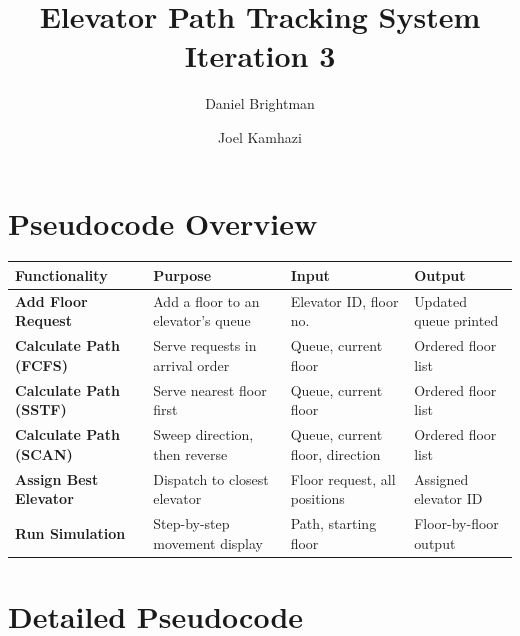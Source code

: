 \documentclass[a4paper,11pt]{article}
\title{\textbf{Elevator Path Tracking System} \\ Iteration 3}
\author{Daniel Brightman \and Joel Kamhazi}
\date{}
\begin{document}
\maketitle

\section{Pseudocode Overview}

\begin{tabular}{>{\bfseries}p{3.5cm} p{4cm} p{3cm} p{3cm}}
\toprule
Functionality & Purpose & Input & Output \\
\midrule
Add Floor Request   & Add a floor to an elevator's queue        & Elevator ID, floor no.           & Updated queue printed \\
Calculate Path (FCFS) & Serve requests in arrival order         & Queue, current floor             & Ordered floor list \\
Calculate Path (SSTF) & Serve nearest floor first               & Queue, current floor             & Ordered floor list \\
Calculate Path (SCAN) & Sweep direction, then reverse           & Queue, current floor, direction  & Ordered floor list \\
Assign Best Elevator  & Dispatch to closest elevator            & Floor request, all positions     & Assigned elevator ID \\
Run Simulation        & Step-by-step movement display           & Path, starting floor             & Floor-by-floor output \\
\bottomrule
\end{tabular}

\section{Detailed Pseudocode}
\end{document}
